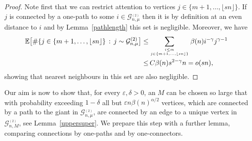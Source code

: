 \documentclass[12pt,a4paper]{article}
\numberwithin{equation}{section}
\begin{document}
\begin{proof} Note first that we can restrict attention to
    vertices $j\in \{m+1,\dots, \lfloor sn \rfloor \}$. If $j$ is  connected by a one-path to some $i \in \mathcal G^{_{(2)}}_{n,\mu}$ then it is by definition at an even distance to $i$ and by Lemma~\ref{pathlength} this set is negligible. Moreover, we have
    \begin{align*}
   \mathbb E \big[\#\{j\in\{m+1,\dots,\lfloor sn \rfloor\}\,:\,j\sim \mathcal G^{(2)}_{n, \mu} \big]\le &\sum_{i\le m \atop j\in\{m+1,\dots,\lfloor sn \rfloor\}} \beta(n) i^{-\gamma}j^{\gamma-1}   \\ \le&\, C\beta(n)s^{2-\gamma}n =o(sn),
   \end{align*}
   showing that nearest neighbours in this set are also negligible.
\end{proof}

Our aim is now to show that, for every $\varepsilon, \delta>0$, an $M$ can be chosen so large that with probability exceeding $1-\delta$ all but $\varepsilon n\beta(n)^{\alpha/2}$ vertices, which are connected by a path to the giant in $\mathscr G_{n,\mu}^{_{(2)}}$, are connected by an edge to a unique vertex in $\mathscr G_{n,M}^{_{(2)}}$, see Lemma~\ref{uppersuper}. We prepare this step with a further lemma, comparing connections by one-paths and by one-connectors.
\end{document}

